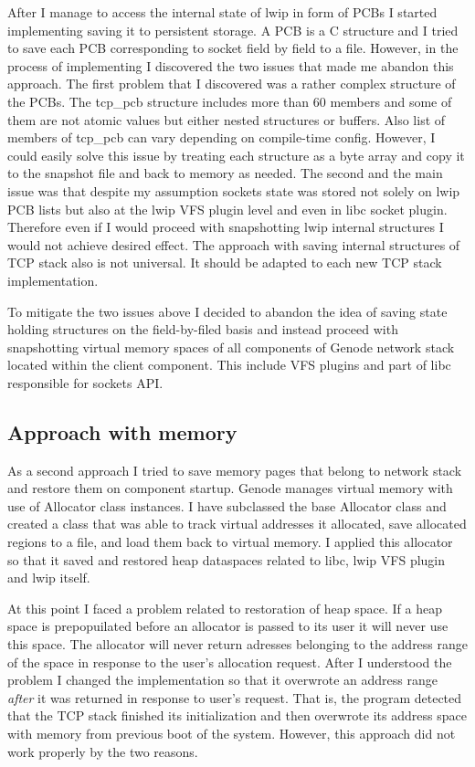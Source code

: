 After I manage to access the internal state of lwip in form of PCBs I started
implementing saving it to persistent storage. A PCB is a C structure and I
tried to save each PCB corresponding to socket field by field to a file.
However, in the process of implementing I discovered the two issues that made
me abandon this approach. The first problem that I discovered was a rather
complex structure of the PCBs. The tcp\_pcb structure includes more than 60
members and some of them are not atomic values but either nested structures or
buffers. Also list of members of tcp\_pcb can vary depending on compile-time
config. However, I could easily solve this issue by treating each structure as
a byte array and copy it to the snapshot file and back to memory as needed. The
second and the main issue was that despite my assumption sockets state was
stored not solely on lwip PCB lists but also at the lwip VFS plugin level and
even in libc socket plugin. Therefore even if I would proceed with snapshotting
lwip internal structures I would not achieve desired effect. The approach with
saving internal structures of TCP stack also is not universal. It should be
adapted to each new TCP stack implementation.

To mitigate the two issues above I decided to abandon the idea of saving state
holding structures on the field-by-filed basis and instead proceed with
snapshotting virtual memory spaces of all components of Genode network stack
located within the client component. This include VFS plugins and part of libc
responsible for sockets API.

\subsection{Approach with memory}
As a second approach I tried to save memory pages that belong to network stack
and restore them on component startup. Genode manages virtual memory with use
of Allocator class instances. I have subclassed the base Allocator class and
created a class that was able to track virtual addresses it allocated, save
allocated regions to a file, and load them back to virtual memory. I applied
this allocator so that it saved and restored heap dataspaces related to libc,
lwip VFS plugin and lwip itself.

At this point I faced a problem related to restoration of heap space. If a heap
space is prepopuilated before an allocator is passed to its user it will never
use this space. The allocator will never return adresses belonging to the
address range of the space in response to the user's allocation request. After
I understood the problem I changed the implementation so that it overwrote an
address range \textit{after} it was returned in response to user's request.
That is, the program detected that the TCP stack finished its initialization
and then overwrote its address space with memory from previous boot of the
system. However, this approach did not work properly by the two reasons. 

